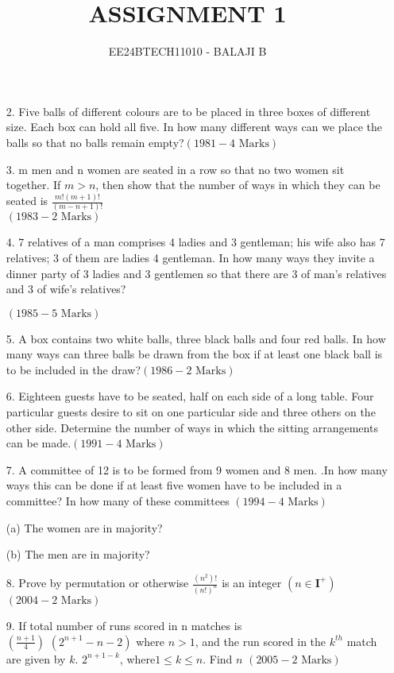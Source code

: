 \documentclass[journal,12pt,twocolumn]{IEEEtran}
\theoremstyle{remark}
\begin{document}

\vspace{3cm}

\title{ASSIGNMENT 1}
\author{EE24BTECH11010 - BALAJI B}
\maketitle
\newpage
\bigskip

\renewcommand{\thefigure}{\theenumi}
\renewcommand{\thetable}{\theenumi}
\begin{enumerate}
    \item[2.]   Five balls of different colours are to be placed in three boxes of different size. Each box can hold all five. In how many different ways can we place the balls so that no balls remain empty?\hfill $(1981- 4 \text{ Marks})$
    \item[3.] m men and n women are seated in a row so that no two women sit together. If $m>n$, then show that the number of ways in which they can be seated is $\frac{m!(m+1)!}{(m-n+1)!}$ \\

    \hfill $(1983-2\text{ Marks})$
    \item[4.] 7 relatives of a man comprises 4 ladies and 3 gentleman; his wife also has 7 relatives; 3 of them are ladies 4 gentleman. In how many ways they invite a dinner party of 3 ladies and 3 gentlemen so that there are 3 of man's relatives and 3 of wife's relatives?
    
    \hfill $(1985- 5 \text{ Marks})$
    \item[5.]A box contains two white balls, three black balls and four red balls. In how many ways can three balls be drawn from the box if at least one black ball is to be included in the draw?\hfill $(1986-2\text{ Marks})$  
    \item[6. ] Eighteen guests have to be seated, half on each side of a long table. Four particular guests desire to sit on one particular side and three others on the other side. Determine the number of ways in which the sitting arrangements can be made.\hfill $(1991-4\text{ Marks})$
    \item[7.]A committee of 12 is to be formed from 9 women and 8 men. .In how many ways this can be done if at least five women have to be included in a committee? In how many of these committees \hfill $(1994- 4 \text{ Marks})$

    (a)  The women are in majority?
    
    (b)  The men are in majority?
    
    \item[8. ] Prove by permutation or otherwise $\frac{(n^2)!}{(n!)^n}$ is an integer $(n\in \mathbf{I}^+) $\hfill $(2004-2\text{ Marks})$  
     \item[9. ] If total number of runs scored in n matches is\\
     
     $\left(\frac{n+1}{4}\right)$ $(2^{n+1}-n-2)$ where $n>1$, and the run scored in the $k^{th}$ match are given by $k$. $2^{n+1-k}$, where$ 1 \leq k \leq n$. Find $n$ \hfill $(2005- 2 \text{ Marks})$
     
    \end{enumerate}
\end{document}
